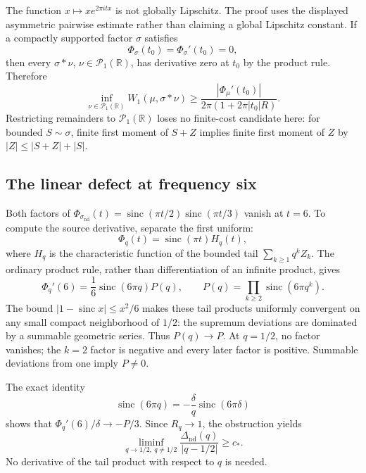 \documentclass[11pt,letterpaper]{article}
\theoremstyle{remark}\newtheorem{remark}[theorem]{Remark}
\newcommand{\R}{\mathbb R}\newcommand{\E}{\mathbb E}
\newcommand{\Pone}{\mathcal P_1(\R)}
\newcommand{\sinc}{\operatorname{sinc}}
\begin{document}
The function $x\mapsto xe^{2\pi itx}$ is not globally Lipschitz. The proof uses the displayed asymmetric pairwise estimate rather than claiming a global Lipschitz constant. If a compactly supported factor $\sigma$ satisfies
\[
\Phi_\sigma(t_0)=\Phi_\sigma'(t_0)=0,
\]
then every $\sigma*\nu$, $\nu\in\Pone$, has derivative zero at $t_0$ by the product rule. Therefore
\begin{equation}\label{eq:obstruction}
\inf_{\nu\in\Pone}W_1(\mu,\sigma*\nu)
\ge\frac{|\Phi_\mu'(t_0)|}{2\pi(1+2\pi|t_0|R)}.
\end{equation}
Restricting remainders to $\Pone$ loses no finite-cost candidate here: for bounded $S\sim\sigma$, finite first moment of $S+Z$ implies finite first moment of $Z$ by $|Z|\le|S+Z|+|S|$.

\subsection{The linear defect at frequency six}
Both factors of $\Phi_{\sigma_{\mathrm{nd}}}(t)=\sinc(\pi t/2)\sinc(\pi t/3)$ vanish at $t=6$. To compute the source derivative, separate the first uniform:
\[
\Phi_q(t)=\sinc(\pi t)H_q(t),
\]
where $H_q$ is the characteristic function of the bounded tail $\sum_{k\ge1}q^kZ_k$. The ordinary product rule, rather than differentiation of an infinite product, gives
\begin{equation}\label{eq:linear-defect}
\Phi_q'(6)=\frac16\sinc(6\pi q)P(q),\qquad
P(q)=\prod_{k\ge2}\sinc(6\pi q^k).
\end{equation}
The bound $|1-\sinc x|\le x^2/6$ makes these tail products uniformly convergent on any small compact neighborhood of $1/2$: the supremum deviations are dominated by a summable geometric series. Thus $P(q)\to P$. At $q=1/2$, no factor vanishes; the $k=2$ factor is negative and every later factor is positive. Summable deviations from one imply $P\ne0$.

The exact identity
\[
\sinc(6\pi q)=-\frac{\delta}{q}\sinc(6\pi\delta)
\]
shows that $\Phi_q'(6)/\delta\to-P/3$. Since $R_q\to1$, the obstruction yields
\begin{equation}\label{eq:liminf-linear}
\liminf_{q\to1/2,\ q\ne1/2}\frac{\Delta_{\mathrm{nd}}(q)}{|q-1/2|}\ge c_*.
\end{equation}
No derivative of the tail product with respect to $q$ is needed.
\end{document}
